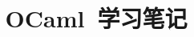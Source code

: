 \documentclass{NoTex/NoTex}
\begin{document}
    \title{~OCaml~学习笔记}
    \maketitle
    \tableofcontents

    
\end{document}
